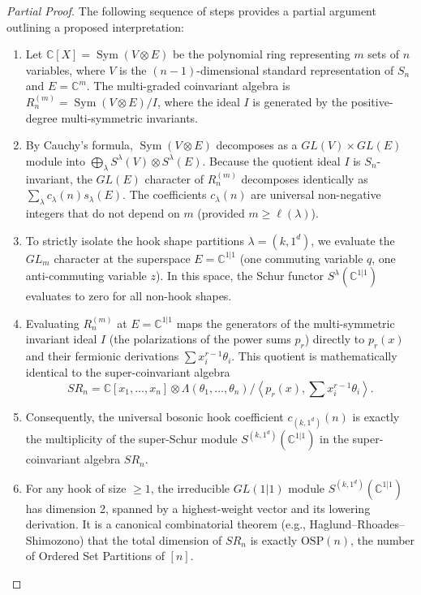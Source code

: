 \documentclass[12pt]{article}
\begin{document}
\begin{proof}[Partial Proof]
The following sequence of steps provides a partial argument outlining a proposed interpretation:

\begin{enumerate}
    \item Let $\mathbb{C}[X] = \operatorname{Sym}(V \otimes E)$ be the polynomial ring representing $m$ sets of $n$ variables, where $V$ is the $(n-1)$-dimensional standard representation of $S_n$ and $E = \mathbb{C}^m$. The multi-graded coinvariant algebra is $R_n^{(m)} = \operatorname{Sym}(V \otimes E) / I$, where the ideal $I$ is generated by the positive-degree multi-symmetric invariants.
    
    \item By Cauchy's formula, $\operatorname{Sym}(V \otimes E)$ decomposes as a $GL(V) \times GL(E)$ module into $\bigoplus_{\lambda} S^\lambda(V) \otimes S^\lambda(E)$. Because the quotient ideal $I$ is $S_n$-invariant, the $GL(E)$ character of $R_n^{(m)}$ decomposes identically as $\sum_\lambda c_\lambda(n) s_\lambda(E)$. The coefficients $c_\lambda(n)$ are universal non-negative integers that do not depend on $m$ (provided $m \ge \ell(\lambda)$).
    
    \item To strictly isolate the hook shape partitions $\lambda = (k, 1^d)$, we evaluate the $GL_m$ character at the superspace $E = \mathbb{C}^{1|1}$ (one commuting variable $q$, one anti-commuting variable $z$). In this space, the Schur functor $S^\lambda(\mathbb{C}^{1|1})$ evaluates to zero for all non-hook shapes. 
    
    \item Evaluating $R_n^{(m)}$ at $E = \mathbb{C}^{1|1}$ maps the generators of the multi-symmetric invariant ideal $I$ (the polarizations of the power sums $p_r$) directly to $p_r(x)$ and their fermionic derivations $\sum x_i^{r-1} \theta_i$. This quotient is mathematically identical to the super-coinvariant algebra 
    \[
    SR_n = \mathbb{C}[x_1, \dots, x_n] \otimes \Lambda(\theta_1, \dots, \theta_n) / \left\langle p_r(x), \sum x_i^{r-1} \theta_i \right\rangle.
    \]
    
    \item Consequently, the universal bosonic hook coefficient $c_{(k, 1^d)}(n)$ is exactly the multiplicity of the super-Schur module $S^{(k, 1^d)}(\mathbb{C}^{1|1})$ in the super-coinvariant algebra $SR_n$. 
    
    \item For any hook of size $\ge 1$, the irreducible $GL(1|1)$ module $S^{(k, 1^d)}(\mathbb{C}^{1|1})$ has dimension 2, spanned by a highest-weight vector and its lowering derivation. It is a canonical combinatorial theorem (e.g., Haglund--Rhoades--Shimozono) that the total dimension of $SR_n$ is exactly $\mathrm{OSP}(n)$, the number of Ordered Set Partitions of $[n]$.
    

\end{enumerate}
\end{proof}
\end{document}
